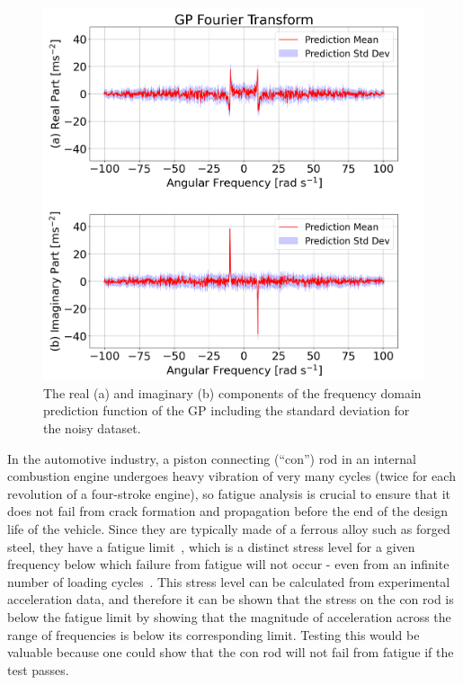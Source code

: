 \documentclass[12pt]{article}
\begin{document}
    \begin{figure}[!htb]
        \centering
        \includegraphics[width=\linewidth]{figures/stdv-plot/stdv-plot.png}
        \caption{The real (a) and imaginary (b) components of the frequency domain prediction function of the GP including the standard deviation for the noisy dataset.}
        \label{fig:stdv-plot}
    \end{figure}

    In the automotive industry, a piston connecting (``con'') rod in an internal combustion engine undergoes heavy vibration of very many cycles (twice for each revolution of a four-stroke engine), so fatigue analysis is crucial to ensure that it does not fail from crack formation and propagation before the end of the design life of the vehicle.
    Since they are typically made of a ferrous alloy such as forged steel, they have a fatigue limit~\cite{RoymechFatigue}, which is a distinct stress level for a given frequency below which failure from fatigue will not occur - even from an infinite number of loading cycles~\cite{BeerJohnston1992}.
    This stress level can be calculated from experimental acceleration data, and therefore it can be shown that the stress on the con rod is below the fatigue limit by showing that the magnitude of acceleration across the range of frequencies is below its corresponding limit.
    Testing this would be valuable because one could show that the con rod will not fail from fatigue if the test passes.
\end{document}
